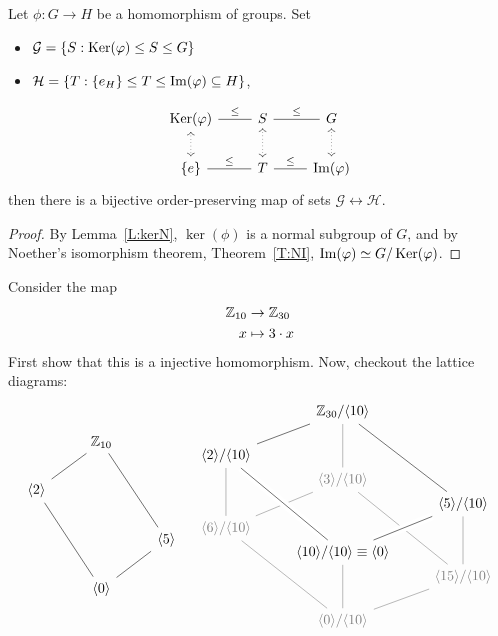 \documentclass{ximera}
\begin{document}
\begin{corollary}
  Let $\phi:G\to H$ be a homomorphism of groups. Set
  \begin{itemize}
  \item $\mathcal{G} = \{S:\mathop{\mathrm{Ker}}\nolimits(\varphi)\leq S\leq G\}$
  \item $\mathcal{H} = \{T:\{e_H\}\leq T\leq \operatorname{Im}(\varphi)\subseteq H\}$,
  \end{itemize}
  \[
  \begin{tikzcd}
    \ker(\phi) \ar[r,-,"\subgp"] \ar[d,<->,dotted]& S\ar[r,-,"\subgp"] \ar[d,<->,dotted]& G \ar[d,<->,dotted]\\
    \{e\} \ar[r,-,"\subgp"] & T \ar[r,-,"\subgp"] & \im(\phi)
  \end{tikzcd}
  \]
  then there is a bijective order-preserving map of sets
  $\mathcal{G}\leftrightarrow\mathcal{H}$.
  \begin{proof}
    By Lemma~\ref{L:kerN}, $\ker(\phi)$ is a normal subgroup of $G$,
    and by Noether's isomorphism theorem, Theorem~\ref{T:NI},
    $\operatorname{Im}(\varphi)\simeq G/\mathop{\mathrm{Ker}}\nolimits(\varphi)$.
  \end{proof}
\end{corollary}

\begin{example}
  Consider the map
  \begin{align*}
    \mathbb Z_{10} &\to \mathbb Z_{30}\\
    x &\mapsto 3\cdot x
  \end{align*}
  First show that this is a injective homomorphism. Now, checkout the
  lattice diagrams:
  \[
  \begin{tikzcd}
    & \Z_{10} \ar[ld,-]  \ar[rdd,-] &       \\
    \< 2\> \ar[rdd,-]&       &       \\
    &       & \<5\> \ar[ld,-]\\
    & \<0\> &
  \end{tikzcd}
  \quad
  \begin{tikzcd}[row sep=0in]
    & \Z_{30}/\<10\>\ar[ldd,-]  \ar[white!50!black,ddd,-] \ar[rdddd,-] &       \\
    &\phantom{MM} & \\
    \<2\> /\<10\> \ar[white!50!black,ddd,-] &   &  \\
    & \color{white!50!black}\<3\>/\<10\>\ar[white!50!black,ldd,-]\ar[white!50!black,rdddd,-] & \\
    &  &  \<5\> /\<10\>\ar[white!50!black,ddd,-]\\
     \color{white!50!black}\<6\>/\<10\>\ar[white!50!black,rdddd,-]& & \\
    &\<10\>/\<10\> \equiv \<0\> \ar[white!50!black,ddd,-]\ar[ruu,-,white,line width=2mm]\ar[ruu,-]\ar[luuuu,-,white,line width=2mm]\ar[luuuu,-] & \\
    & & \color{white!50!black} \<15\>/\<10\>\ar[white!50!black,ldd,-]\\
    &\phantom{MM} & \\
    &  \color{white!50!black}\<0\>/\<10\> &
  \end{tikzcd}
  \]
\end{example}
\end{document}
